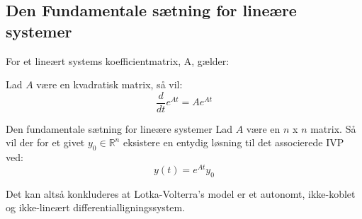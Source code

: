 \subsection{Den Fundamentale sætning for lineære systemer}

For et lineært systems koefficientmatrix, A, gælder:
\begin{lemma}{}{}
Lad $A$ være en kvadratisk matrix, så vil:
$$\frac{d}{dt}e^{At} = Ae^{At}$$
\end{lemma}

\begin{mytheo}{Den fundamentale sætning for lineære systemer}{}
Lad $A$ være en $n$ x $n$ matrix. Så vil der for et givet $y_0 \in \mathbb{R}^n$ eksistere en entydig løsning til det associerede IVP ved:
$$y(t) = e^{At}y_0$$
\end{mytheo}

Det kan altså konkluderes at Lotka-Volterra's model er et autonomt, ikke-koblet og ikke-lineært differentialligningssystem.


